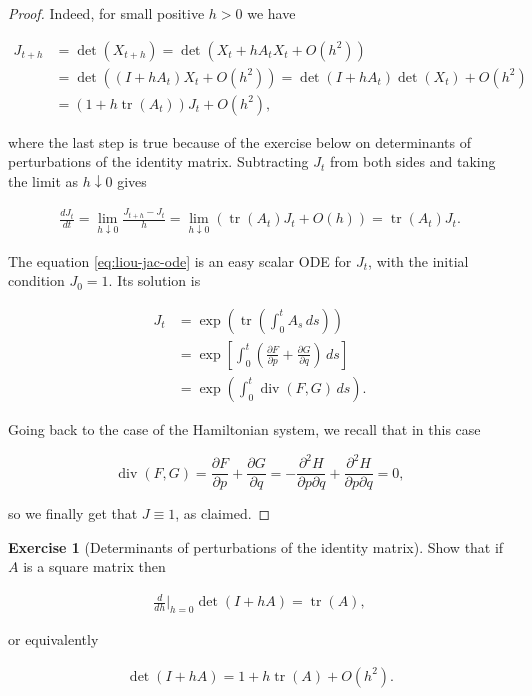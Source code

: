 \documentclass[11pt]{report}
\theoremstyle{plain}
\theoremstyle{definition}
\newtheorem{xexercise}[thm]{Exercise}
\begin{document}
\begin{proof}
\noindent Indeed, for small positive $h>0$ we have

\begin{align*}
J_{t+h} &= \det(X_{t+h}) = \det( X_t+h A_t X_t + O(h^2) ) \\
&= \det((I+h A_t)X_t+O(h^2))
= \det(I+h A_t) \det(X_t) + O(h^2) \\
&= (1 + h \operatorname{tr}(A_t)) J_t + O(h^2),
\end{align*}

\noindent where the last step is true because of the exercise
below on determinants of perturbations of the identity
matrix. Subtracting $J_t$ from both sides and taking
the limit as $h\downarrow 0$ gives

\begin{align*}
\frac{dJ_t}{dt} = \lim_{h\downarrow 0} \frac{J_{t+h}-J_t}{h} =
\lim_{h\downarrow 0} \left(\operatorname{tr}(A_t)J_t + O(h)\right) = \operatorname{tr}(A_t)J_t.
\end{align*}

\noindent The equation \eqref{eq:liou-jac-ode} is an easy scalar ODE
for $J_t$, with the initial condition $J_0=1$. Its
solution is

\begin{equation*} \tag{19}\label{eq:liouville-jacobian}
\begin{split}
J_t &= \exp\left( \operatorname{tr}\left(\int_0^t A_s\,ds\right)\right) \\
&= \exp\left[ \int_0^t \left(\frac{\partial F}{\partial p}+\frac{\partial G}{\partial q}\right)\,ds \right] \\
&= \exp\left( \int_0^t \operatorname{div}(F,G) \,ds \right).
\end{split}
\end{equation*}

\noindent Going back to the case of the Hamiltonian system, we
recall that in this case

\[
\operatorname{div} (F,G) = \frac{\partial F}{\partial p}+\frac{\partial G}{\partial q} = -\frac{\partial^2 H}{\partial p \partial q} +
\frac{\partial^2 H}{\partial p \partial q} = 0,
\]

\noindent so we finally get that $J \equiv 1$, as claimed.
\end{proof}

\begin{xexercise}[Determinants of perturbations of the identity matrix]
Show that if $A$ is a square matrix then

\begin{align*}
\frac{d}{dh}\Big|_{h=0} \det(I+h A) = \operatorname{tr}(A),
\end{align*}

\noindent or equivalently

\begin{align*}
\det(I+h A) = 1 + h \operatorname{tr}(A) + O(h^2).
\end{align*}

\end{xexercise}
\end{document}
